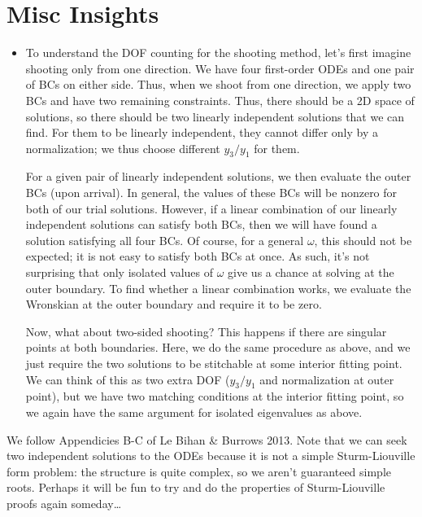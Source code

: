 \documentclass[11pt,
        usenames, %
        twocolumn,
        landscape,
        dvipsnames %
    ]{article}
\begin{document}
\section{Misc Insights}

\begin{itemize}
    \item To understand the DOF counting for the shooting method, let's first
        imagine shooting only from one direction. We have four first-order ODEs
        and one pair of BCs on either side. Thus, when we shoot from one
        direction, we apply two BCs and have two remaining constraints. Thus,
        there should be a 2D space of solutions, so there should be two
        linearly independent solutions that we can find. For them to be linearly
        independent, they cannot differ only by a normalization; we thus choose
        different $y_3 / y_1$ for them.

        For a given pair of linearly independent solutions, we then evaluate the
        outer BCs (upon arrival). In general, the values of these BCs will be
        nonzero for both of our trial solutions. However, if a linear
        combination of our linearly independent solutions can satisfy both BCs,
        then we will have found a solution satisfying all four BCs. Of course,
        for a general $\omega$, this should not be expected; it is not easy to
        satisfy both BCs at once. As such, it's not surprising that only
        isolated values of $\omega$ give us a chance at solving at the outer
        boundary. To find whether a linear combination works, we evaluate the
        Wronskian at the outer boundary and require it to be zero.

        Now, what about two-sided shooting? This happens if there are
        singular points at both boundaries. Here, we do the same procedure as
        above, and we just require the two solutions to be stitchable at some
        interior fitting point. We can think of this as two extra DOF ($y_3 /
        y_1$ and normalization at outer point), but we have two matching
        conditions at the interior fitting point, so we again have the same
        argument for isolated eigenvalues as above.
\end{itemize}

We follow Appendicies B-C of Le Bihan \& Burrows 2013. Note that we can seek two
independent solutions to the ODEs because it is not a simple Sturm-Liouville
form problem: the structure is quite complex, so we aren't guaranteed simple
roots. Perhaps it will be fun to try and do the properties of Sturm-Liouville
proofs again someday\dots
\end{document}
